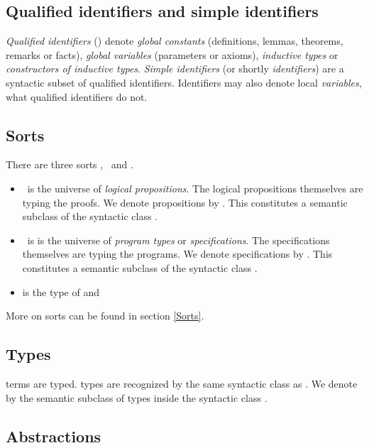\subsection{Qualified identifiers and simple identifiers}
\label{qualid}\label{ident}

{\em Qualified identifiers} ({\qualid}) denote {\em global constants}
(definitions, lemmas, theorems, remarks or facts), {\em global
variables} (parameters or axioms), {\em inductive
types} or {\em constructors of inductive types}.
{\em Simple identifiers} (or shortly {\em identifiers}) are a
syntactic subset of qualified identifiers.  Identifiers may also
denote local {\em variables}, what qualified identifiers do not.

\subsection{Sorts}
\label{Gallina-sorts}

There are three sorts \Set, \Prop\ and \Type.

\begin{itemize}
\item \Prop\ is the universe of {\em logical propositions}.
The logical propositions themselves are typing the proofs.
We denote propositions by {\form}. This constitutes a semantic
subclass of the syntactic class {\term}.
\item \Set\ is is the universe of {\em program
types} or {\em specifications}.
The specifications themselves are typing the programs.
We denote specifications by {\specif}. This constitutes a semantic
subclass of the syntactic class {\term}.
\item {\Type} is the type of {\Set} and {\Prop}
\end{itemize}

\noindent More on sorts can be found in section \ref{Sorts}.

\subsection{Types}

{\Coq} terms are typed. {\Coq} types are recognized by the same
syntactic class as {\term}. We denote by {\type} the semantic subclass
of types inside the syntactic class {\term}.

\subsection{Abstractions}

